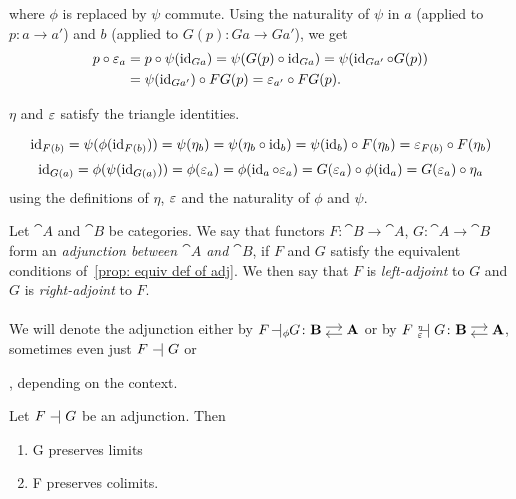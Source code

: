 \begin{bigproof}
\begin{smallproof}
    where $\phi$ is replaced by $\psi$ commute. Using the naturality of $\psi$ in $a$ (applied to $p \colon a \to a'$)
    and $b$ (applied to $G(p) \colon Ga \to Ga'$), we get
    \begin{align*}
        p \circ \varepsilon_a &= p \circ \psi(\operatorname{id}_{Ga}) = \psi(G(p) \circ \operatorname{id}_{Ga}) = \psi(\operatorname{id}_{Ga'} \circ G(p)) \\
        &= \psi(\operatorname{id}_{Ga'}) \circ FG(p) = \varepsilon_{a'} \circ FG(p).
    \end{align*}
\end{smallproof}
\begin{claim} 
    $\eta$ and $\varepsilon$ satisfy the triangle identities.
\end{claim}
\begin{smallproof}
    \[
        \operatorname{id}_{F(b)} = \psi(\phi(\operatorname{id}_{F(b)})) = \psi(\eta_b) 
        = \psi(\eta_b \circ \operatorname{id}_b) = \psi(\operatorname{id}_b) \circ F(\eta_b) = \varepsilon_{F(b)} \circ F(\eta_b)
    \]
    \[
       \operatorname{id}_{G(a)} = \phi(\psi(\operatorname{id}_{G(a)})) = \phi(\varepsilon_a) = \phi(\operatorname{id}_a \circ \varepsilon_a) 
       = G(\varepsilon_a) \circ \phi(\operatorname{id}_a) = G(\varepsilon_a) \circ \eta_a
    \]
    using the definitions of $\eta$, $\varepsilon$ and the naturality of $\phi$ and $\psi$.
\end{smallproof}
\end{bigproof}
\begin{definition}[Adjunction]
    Let $\cat{A}$ and $\cat{B}$ be categories. 
    We say that functors
    $F \colon \cat{B} \to \cat{A}$, $G \colon \cat{A} \to \cat{B}$
    form an \textit{adjunction between $\cat{A}$ and $\cat{B}$},
    if $F$ and $G$ satisfy the equivalent conditions of~\ref{prop: equiv def of adj}. 
    We then say that $F$ is \textit{left-adjoint} to $G$ and $G$ is \textit{right-adjoint}
    to $F$. \\ \\
    We will denote the adjunction either by $F \! \adj_{\phi}\!\! G \colon \adjar{B}{A}$ or by 
    $F {\ }_{\eps}^{\text{\tiny{$\eta$}}}\!\!\!\!\adj G \colon \adjar{B}{A}$,
    sometimes even just $F \mathrel{-} \mathrel{\mkern-3.5mu} \mathrel{|} G$ or 
    , depending on the context.
\end{definition}

\begin{remark}
    Let $F \mathrel{-} \mathrel{\mkern-3.5mu} \mathrel{|} G$ be an adjunction.
    Then
    \begin{enumerate}
        \item G preserves limits
        \item F preserves colimits.
    \end{enumerate}
\end{remark}

